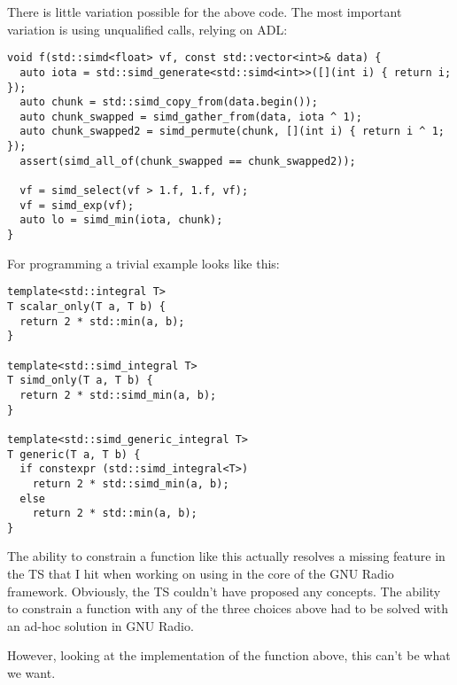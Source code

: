 There is little variation possible for the above code.
The most important variation is using unqualified calls, relying on ADL:
\medskip\begin{lstlisting}[style=Vc]
void f(std::simd<float> vf, const std::vector<int>& data) {
  auto iota = std::simd_generate<std::simd<int>>([](int i) { return i; });
  auto chunk = std::simd_copy_from(data.begin());
  auto chunk_swapped = simd_gather_from(data, iota ^ 1);
  auto chunk_swapped2 = simd_permute(chunk, [](int i) { return i ^ 1; });
  assert(simd_all_of(chunk_swapped == chunk_swapped2));

  vf = simd_select(vf > 1.f, 1.f, vf);
  vf = simd_exp(vf);
  auto lo = simd_min(iota, chunk);
}
\end{lstlisting}

For \simdgeneric programming a trivial example looks like this:
\medskip\begin{lstlisting}[style=Vc]
template<std::integral T>
T scalar_only(T a, T b) {
  return 2 * std::min(a, b);
}

template<std::simd_integral T>
T simd_only(T a, T b) {
  return 2 * std::simd_min(a, b);
}

template<std::simd_generic_integral T>
T generic(T a, T b) {
  if constexpr (std::simd_integral<T>)
    return 2 * std::simd_min(a, b);
  else
    return 2 * std::min(a, b);
}
\end{lstlisting}

The ability to constrain a function like this actually resolves a missing
feature in the TS that I hit when working on using \stdx{} in the
core of the GNU Radio framework.
Obviously, the TS couldn't have proposed any concepts.
The ability to constrain a function with any of the three choices above had to
be solved with an ad-hoc solution in GNU Radio.

However, looking at the implementation of the  function above,
this can't be what we want.

